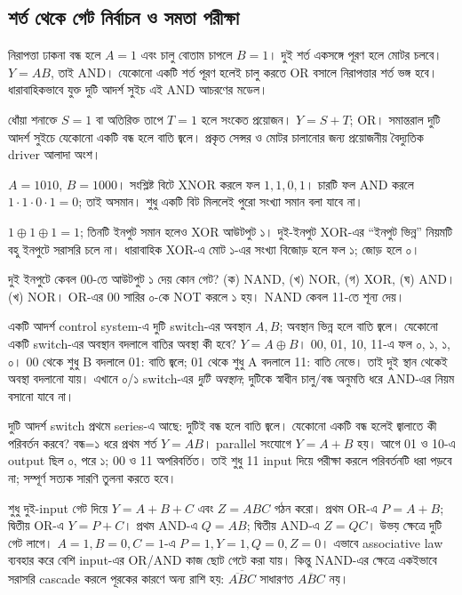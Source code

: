 \subsection{শর্ত থেকে গেট নির্বাচন ও সমতা পরীক্ষা}
নিরাপত্তা ঢাকনা বন্ধ হলে $A=1$ এবং চালু বোতাম চাপলে $B=1$। দুই শর্ত একসঙ্গে পূরণ হলে মোটর চলবে।
\chThreeAnswer $Y=AB$, তাই AND। যেকোনো একটি শর্ত পূরণ হলেই চালু করতে OR বসালে নিরাপত্তার শর্ত ভঙ্গ হবে। ধারাবাহিকভাবে যুক্ত দুটি আদর্শ সুইচ এই AND আচরণের মডেল।

ধোঁয়া শনাক্তে $S=1$ বা অতিরিক্ত তাপে $T=1$ হলে সংকেত প্রয়োজন।
\chThreeAnswer $Y=S+T$; OR। সমান্তরাল দুটি আদর্শ সুইচে যেকোনো একটি বন্ধ হলে বাতি জ্বলে। প্রকৃত সেন্সর ও মোটর চালানোর জন্য প্রয়োজনীয় বৈদ্যুতিক driver আলাদা অংশ।

$A=1010$, $B=1000$।
\chThreeAnswer সংশ্লিষ্ট বিটে XNOR করলে ফল $1,1,0,1$। চারটি ফল AND করলে $1\cdot1\cdot0\cdot1=0$; তাই অসমান। শুধু একটি বিট মিললেই পুরো সংখ্যা সমান বলা যাবে না।

$1\oplus1\oplus1=1$; তিনটি ইনপুট সমান হলেও XOR আউটপুট ১। দুই-ইনপুট XOR-এর ``ইনপুট ভিন্ন'' নিয়মটি বহু ইনপুটে সরাসরি চলে না। ধারাবাহিক XOR-এ মোট ১-এর সংখ্যা বিজোড় হলে ফল ১; জোড় হলে ০।

দুই ইনপুটে কেবল 00-তে আউটপুট ১ দেয় কোন গেট? (ক) NAND, (খ) NOR, (গ) XOR, (ঘ) AND।
\chThreeAnswer (খ) NOR। OR-এর 00 সারির ০-কে NOT করলে ১ হয়। NAND কেবল 11-তে শূন্য দেয়।

একটি আদর্শ control system-এ দুটি switch-এর অবস্থান $A,B$; অবস্থান ভিন্ন হলে বাতি জ্বলে। যেকোনো একটি switch-এর অবস্থান বদলালে বাতির অবস্থা কী হবে?
\chThreeAnswer $Y=A\oplus B$। 00, 01, 10, 11-এ ফল ০, ১, ১, ০। 00 থেকে শুধু B বদলালে 01: বাতি জ্বলে; 01 থেকে শুধু A বদলালে 11: বাতি নেভে। তাই দুই স্থান থেকেই অবস্থা বদলানো যায়। এখানে ০/১ switch-এর \emph{দুটি অবস্থান}; দুটিকে স্বাধীন চালু/বন্ধ অনুমতি ধরে AND-এর নিয়ম বসানো যাবে না।

দুটি আদর্শ switch প্রথমে series-এ আছে: দুটিই বন্ধ হলে বাতি জ্বলে। যেকোনো একটি বন্ধ হলেই জ্বালাতে কী পরিবর্তন করবে?
\chThreeAnswer বন্ধ=১ ধরে প্রথম শর্ত $Y=AB$। parallel সংযোগে $Y=A+B$ হয়। আগে 01 ও 10-এ output ছিল ০, পরে ১; 00 ও 11 অপরিবর্তিত। তাই শুধু 11 input দিয়ে পরীক্ষা করলে পরিবর্তনটি ধরা পড়বে না; সম্পূর্ণ সত্যক সারণি তুলনা করতে হবে।

শুধু দুই-input গেট দিয়ে $Y=A+B+C$ এবং $Z=ABC$ গঠন করো।
\chThreeAnswer প্রথম OR-এ $P=A+B$; দ্বিতীয় OR-এ $Y=P+C$। প্রথম AND-এ $Q=AB$; দ্বিতীয় AND-এ $Z=QC$। উভয় ক্ষেত্রে দুটি গেট লাগে। $A=1,B=0,C=1$-এ $P=1,Y=1,Q=0,Z=0$। এভাবে associative law ব্যবহার করে বেশি input-এর OR/AND কাজ ছোট গেটে করা যায়। কিন্তু NAND-এর ক্ষেত্রে একইভাবে সরাসরি cascade করলে পূরকের কারণে অন্য রাশি হয়: $\overline{\overline{AB}C}$ সাধারণত $\overline{ABC}$ নয়।
